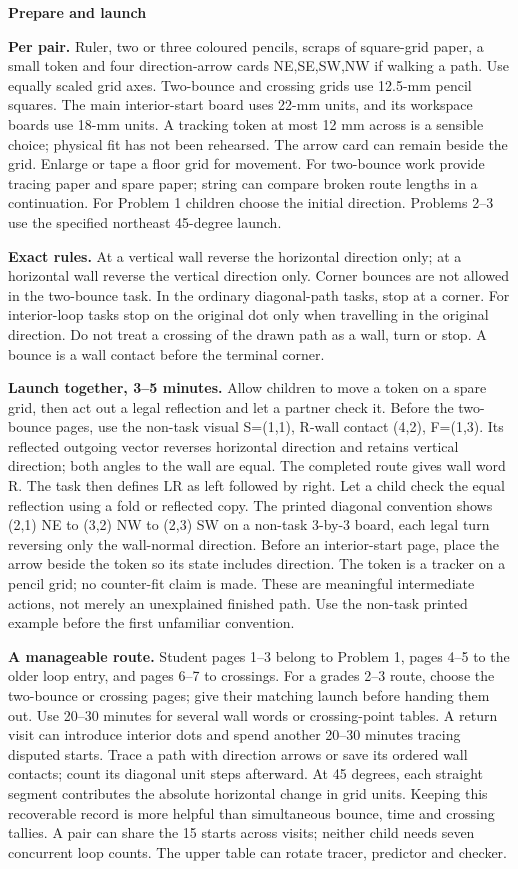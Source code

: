 \documentclass[11pt]{article}
\newcommand{\parttitle}[1]{{\large\bfseries\color{ink}#1}\par}
\newcommand{\labelled}[2]{\textbf{#1} #2\par}
\begin{document}
\newpage
\parttitle{Prepare and launch}
\labelled{Per pair.}{Ruler, two or three coloured pencils, scraps of square-grid paper, a small token and four direction-arrow cards NE,SE,SW,NW if walking a path. Use equally scaled grid axes. Two-bounce and crossing grids use 12.5-mm pencil squares. The main interior-start board uses 22-mm units, and its workspace boards use 18-mm units. A tracking token at most 12 mm across is a sensible choice; physical fit has not been rehearsed. The arrow card can remain beside the grid. Enlarge or tape a floor grid for movement. For two-bounce work provide tracing paper and spare paper; string can compare broken route lengths in a continuation. For Problem 1 children choose the initial direction. Problems 2--3 use the specified northeast 45-degree launch.}
\labelled{Exact rules.}{At a vertical wall reverse the horizontal direction only; at a horizontal wall reverse the vertical direction only. Corner bounces are not allowed in the two-bounce task. In the ordinary diagonal-path tasks, stop at a corner. For interior-loop tasks stop on the original dot only when travelling in the original direction. Do not treat a crossing of the drawn path as a wall, turn or stop. A bounce is a wall contact before the terminal corner.}
\labelled{Launch together, 3--5 minutes.}{Allow children to move a token on a spare grid, then act out a legal reflection and let a partner check it. Before the two-bounce pages, use the non-task visual S=(1,1), R-wall contact (4,2), F=(1,3). Its reflected outgoing vector reverses horizontal direction and retains vertical direction; both angles to the wall are equal. The completed route gives wall word R. The task then defines LR as left followed by right. Let a child check the equal reflection using a fold or reflected copy. The printed diagonal convention shows (2,1) NE to (3,2) NW to (2,3) SW on a non-task 3-by-3 board, each legal turn reversing only the wall-normal direction. Before an interior-start page, place the arrow beside the token so its state includes direction. The token is a tracker on a pencil grid; no counter-fit claim is made. These are meaningful intermediate actions, not merely an unexplained finished path. Use the non-task printed example before the first unfamiliar convention.}
\labelled{A manageable route.}{Student pages 1--3 belong to Problem 1, pages 4--5 to the older loop entry, and pages 6--7 to crossings. For a grades 2--3 route, choose the two-bounce or crossing pages; give their matching launch before handing them out. Use 20--30 minutes for several wall words or crossing-point tables. A return visit can introduce interior dots and spend another 20--30 minutes tracing disputed starts. Trace a path with direction arrows or save its ordered wall contacts; count its diagonal unit steps afterward. At 45 degrees, each straight segment contributes the absolute horizontal change in grid units. Keeping this recoverable record is more helpful than simultaneous bounce, time and crossing tallies. A pair can share the 15 starts across visits; neither child needs seven concurrent loop counts. The upper table can rotate tracer, predictor and checker.}
\end{document}
